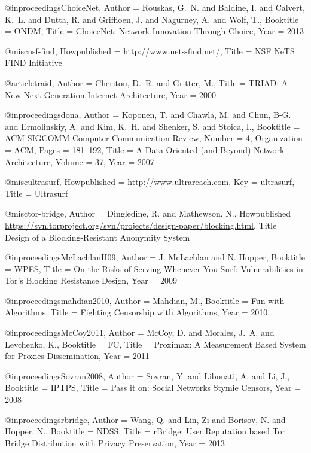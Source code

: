 {{{{{{{	@inproceedings{ChoiceNet,
	Author = {Rouskas, G.~N. and Baldine, I. and Calvert, K.~L. and Dutta, R. and Griffioen, J. and Nagurney, A. and Wolf, T.},
	Booktitle = {ONDM},
	Title = {{ChoiceNet: Network Innovation Through Choice}},
	Year = {2013}}
	
	@misc{nsf-find,
	Howpublished = {http://www.nets-find.net/},
	Title = {{NSF NeTS FIND Initiative}}}
	
	@article{traid,
	Author = {Cheriton, D.~R. and Gritter, M.},
	Title = {{TRIAD: A New Next-Generation Internet Architecture}},
	Year = {2000}}
	
	@inproceedings{dona,
	Author = {Koponen, T. and Chawla, M. and Chun, B-G. and Ermolinskiy, A. and Kim, K.~H. and Shenker, S. and Stoica, I.},
	Booktitle = {ACM SIGCOMM Computer Communication Review},
	Number = {4},
	Organization = {ACM},
	Pages = {181--192},
	Title = {{A Data-Oriented (and Beyond) Network Architecture}},
	Volume = {37},
	Year = {2007}}
	
	@misc{ultrasurf,
	Howpublished = {\url{http://www.ultrareach.com}},
	Key = {ultrasurf},
	Title = {{Ultrasurf}}}
	
	@misc{tor-bridge,
	Author = {Dingledine, R. and Mathewson, N.},
	Howpublished = {\url{https://svn.torproject.org/svn/projects/design-paper/blocking.html}},
	Title = {{Design of a Blocking-Resistant Anonymity System}}}
	
	@inproceedings{McLachlanH09,
	Author = {J. McLachlan and N. Hopper},
	Booktitle = {WPES},
	Title = {{On the Risks of Serving Whenever You Surf: Vulnerabilities in Tor's Blocking Resistance Design}},
	Year = {2009}}
	
	@inproceedings{mahdian2010,
	Author = {Mahdian, M.},
	Booktitle = {{Fun with Algorithms}},
	Title = {{Fighting Censorship with Algorithms}},
	Year = {2010}}
	
	@inproceedings{McCoy2011,
	Author = {McCoy, D. and Morales, J.~A. and Levchenko, K.},
	Booktitle = {FC},
	Title = {{Proximax: A Measurement Based System for Proxies Dissemination}},
	Year = {2011}}
	
	@inproceedings{Sovran2008,
	Author = {Sovran, Y. and Libonati, A. and Li, J.},
	Booktitle = {IPTPS},
	Title = {{Pass it on: Social Networks Stymie Censors}},
	Year = {2008}}
	
	@inproceedings{rbridge,
	Author = {Wang, Q. and Lin, Zi and Borisov, N. and Hopper, N.},
	Booktitle = {{NDSS}},
	Title = {{rBridge: User Reputation based Tor Bridge Distribution with Privacy Preservation}},
	Year = {2013}}
	
}}}}}}}
